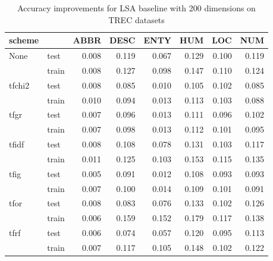 \begin{table}[h]
\begin{center}

\begin{tabular}{llrrrrrr}
\toprule
scheme &  &  ABBR &  DESC &  ENTY &  HUM &  LOC &  NUM \\
\midrule
None & test &     0.008 &     0.119 &     0.067 &    0.129 &    0.100 &    0.119 \\
{} & train &     0.008 &     0.127 &     0.098 &    0.147 &    0.110 &    0.124 \\
tfchi2 & test &     0.008 &     0.085 &     0.010 &    0.105 &    0.102 &    0.085 \\
{} & train &     0.010 &     0.094 &     0.013 &    0.113 &    0.103 &    0.088 \\
tfgr & test &     0.007 &     0.096 &     0.013 &    0.111 &    0.096 &    0.102 \\
{} & train &     0.007 &     0.098 &     0.013 &    0.112 &    0.101 &    0.095 \\
tfidf & test &     0.008 &     0.108 &     0.078 &    0.131 &    0.103 &    0.117 \\
{} & train &     0.011 &     0.125 &     0.103 &    0.153 &    0.115 &    0.135 \\
tfig & test &     0.005 &     0.091 &     0.012 &    0.108 &    0.093 &    0.093 \\
{} & train &     0.007 &     0.100 &     0.014 &    0.109 &    0.101 &    0.091 \\
tfor & test &     0.008 &     0.083 &     0.076 &    0.133 &    0.102 &    0.126 \\
{} & train &     0.006 &     0.159 &     0.152 &    0.179 &    0.117 &    0.138 \\
tfrf & test &     0.006 &     0.074 &     0.057 &    0.120 &    0.095 &    0.113 \\
{} & train &     0.007 &     0.117 &     0.105 &    0.148 &    0.102 &    0.122 \\
\bottomrule
\end{tabular}

\caption[Accuracy improvements for LSA baseline with 200 dimensions on TREC datasets]{Accuracy improvements for LSA baseline with 200 dimensions on TREC datasets}
\label{tab:lsa:resuts:200:TREC}
\end{center}
\end{table}





